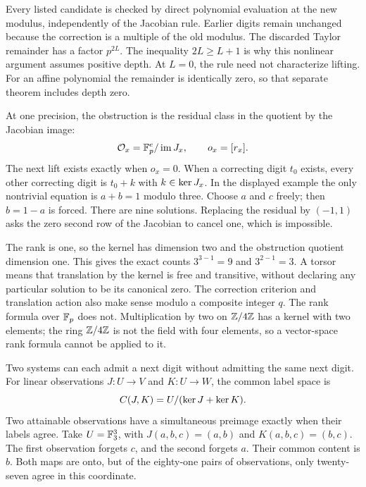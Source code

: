Every listed candidate is checked by direct polynomial evaluation at the new modulus, independently of the Jacobian rule. Earlier digits remain unchanged because the correction is a multiple of the old modulus.
The discarded Taylor remainder has a factor $p^{2L}$. The inequality $2L\ge L+1$ is why this nonlinear argument assumes positive depth. At $L=0$, the rule need not characterize lifting. For an affine polynomial the remainder is identically zero, so that separate theorem includes depth zero.

At one precision, the obstruction is the residual class in the quotient by the Jacobian image:
\[
 \mathcal O_x=\mathbb F_p^e/\operatorname{im} J_x,\qquad o_x=[r_x].
\]
The next lift exists exactly when $o_x=0$. When a correcting digit $t_0$ exists, every other correcting digit is $t_0+k$ with $k\in\operatorname{ker} J_x$.
In the displayed example the only nontrivial equation is $a+b=1$ modulo three. Choose $a$ and $c$ freely; then $b=1-a$ is forced. There are nine solutions. Replacing the residual by $(-1,1)$ asks the zero second row of the Jacobian to cancel one, which is impossible.

The rank is one, so the kernel has dimension two and the obstruction quotient dimension one. This gives the exact counts $3^{3-1}=9$ and $3^{2-1}=3$. A torsor means that translation by the kernel is free and transitive, without declaring any particular solution to be its canonical zero.
The correction criterion and translation action also make sense modulo a composite integer $q$. The rank formula over $\mathbb F_p$ does not. Multiplication by two on $\mathbb Z/4\mathbb Z$ has a kernel with two elements; the ring $\mathbb Z/4\mathbb Z$ is not the field with four elements, so a vector-space rank formula cannot be applied to it.

Two systems can each admit a next digit without admitting the same next digit. For linear observations $J:U\to V$ and $K:U\to W$, the common label space is
\[
 C(J,K)=U/(\operatorname{ker} J+\operatorname{ker} K).
\]
Two attainable observations have a simultaneous preimage exactly when their labels agree.
Take $U=\mathbb F_3^3$, with $J(a,b,c)=(a,b)$ and $K(a,b,c)=(b,c)$. The first observation forgets $c$, and the second forgets $a$. Their common content is $b$. Both maps are onto, but of the eighty-one pairs of observations, only twenty-seven agree in this coordinate.


